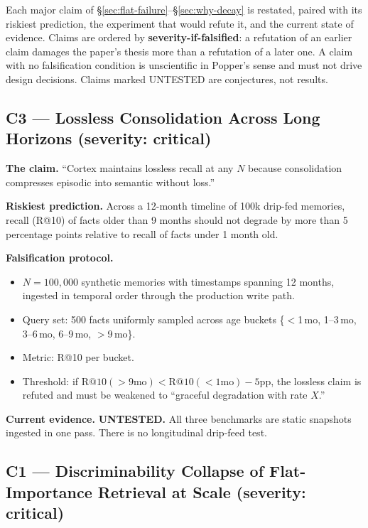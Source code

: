 \documentclass[11pt]{article}
\begin{document}
Each major claim of \S\ref{sec:flat-failure}--\S\ref{sec:why-decay}
is restated, paired with its riskiest prediction, the experiment
that would refute it, and the current state of evidence.  Claims
are ordered by \textbf{severity-if-falsified}: a refutation of an
earlier claim damages the paper's thesis more than a refutation of
a later one.  A claim with no falsification condition is
unscientific in Popper's sense and must not drive design decisions.
Claims marked UNTESTED are conjectures, not results.

\subsection{C3 --- Lossless Consolidation Across Long Horizons (severity: critical)}
\label{app:popper-c3}

\textbf{The claim.} ``Cortex maintains lossless recall at any $N$
because consolidation compresses episodic into semantic without
loss.''

\textbf{Riskiest prediction.}  Across a 12-month timeline of 100k
drip-fed memories, recall (R@10) of facts older than 9 months
should not degrade by more than 5 percentage points relative to
recall of facts under 1 month old.

\textbf{Falsification protocol.}
\begin{itemize}
  \item $N = 100{,}000$ synthetic memories with timestamps spanning
        12 months, ingested in temporal order through the
        production write path.
  \item Query set: 500 facts uniformly sampled across age buckets
        \{$<$1\,mo, 1--3\,mo, 3--6\,mo, 6--9\,mo, $>$9\,mo\}.
  \item Metric: R@10 per bucket.
  \item Threshold: if
        $\mathrm{R@10}({>}9\mathrm{mo}) <
         \mathrm{R@10}({<}1\mathrm{mo}) - 5\mathrm{pp}$, the
        lossless claim is refuted and must be weakened to
        ``graceful degradation with rate $X$.''
\end{itemize}

\textbf{Current evidence.} \textbf{UNTESTED.}  All three benchmarks
are static snapshots ingested in one pass.  There is no
longitudinal drip-feed test.

\subsection{C1 --- Discriminability Collapse of Flat-Importance Retrieval at Scale (severity: critical)}
\label{app:popper-c1}
\end{document}
